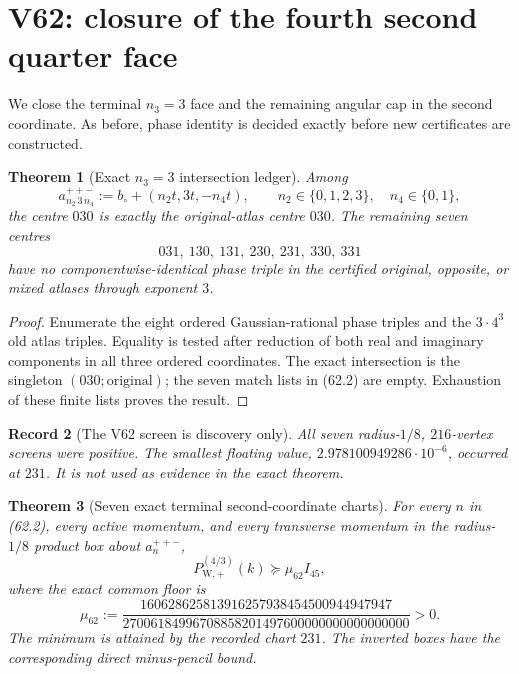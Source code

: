 \documentclass[11pt,oneside]{article}
\newtheorem{theorem}{Theorem}[section]
\newtheorem{record}[theorem]{Record}
\theoremstyle{definition}
\theoremstyle{remark}
\begin{document}
\section{V62: closure of the fourth second quarter face}
\label{sec:newv62-fourth-second-face}

We close the terminal \(n_3=3\) face and the remaining angular cap
in the second coordinate.  As before, phase identity is decided
exactly before new certificates are constructed.

\begin{theorem}[Exact \(n_3=3\) intersection ledger]
\label{thm:newv62-intersections}
Among
\[
 a_{n_2\,3\,n_4}^{++-}
 :=b_\circ+(n_2t,3t,-n_4t),
 \qquad n_2\in\{0,1,2,3\},\quad n_4\in\{0,1\},        \tag{62.1}
\]
the centre \(030\) is exactly the original-atlas centre \(030\).
The remaining seven centres
\[
 031,\ 130,\ 131,\ 230,\ 231,\ 330,\ 331             \tag{62.2}
\]
have no componentwise-identical phase triple in the certified
original, opposite, or mixed atlases through exponent \(3\).
\end{theorem}

\begin{proof}
Enumerate the eight ordered Gaussian-rational phase triples and the
\(3\cdot4^3\) old atlas triples.  Equality is tested after reduction
of both real and imaginary components in all three ordered
coordinates.  The exact intersection is the singleton
\((030;\mathrm{original})\); the seven match lists in (62.2) are
empty.  Exhaustion of these finite lists proves the result.
\end{proof}

\begin{record}[The V62 screen is discovery only]
\label{rec:newv62-screen}
All seven radius-\(1/8\), \(216\)-vertex screens were positive.
The smallest floating value,
\(2.978100949286\cdot10^{-6}\), occurred at \(231\).  It is not
used as evidence in the exact theorem.
\end{record}

\begin{theorem}[Seven exact terminal second-coordinate charts]
\label{thm:newv62-seven-charts}
For every \(n\) in (62.2), every active momentum, and every
transverse momentum in the radius-\(1/8\) product box about
\(a_n^{++-}\),
\[
 P_{\mathrm W,+}^{(4/3)}(k)\succeq\mu_{62}I_{45},    \tag{62.3}
\]
where the exact common floor is
\[
 \mu_{62}:=
 \frac{160628625813916257938454500944947947}
 {27006184996708858201497600000000000000000}>0.       \tag{62.4}
\]
The minimum is attained by the recorded chart \(231\).  The
inverted boxes have the corresponding direct minus-pencil bound.
\end{theorem}
\end{document}
